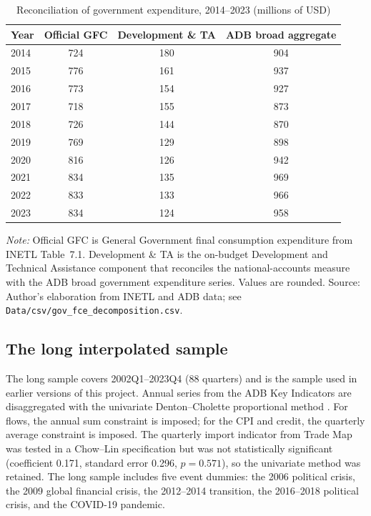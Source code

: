 \documentclass[11pt,a4paper]{article}
\begin{document}
\begin{table}[htbp]
\centering
\small
\caption{Reconciliation of government expenditure, 2014--2023 (millions of USD)}
\label{tab:gov_decomposition}
\begin{tabular}{@{}lccc@{}}
\toprule
Year & Official GFC & Development \& TA & ADB broad aggregate \\
\midrule
2014 & 724 & 180 & 904 \\
2015 & 776 & 161 & 937 \\
2016 & 773 & 154 & 927 \\
2017 & 718 & 155 & 873 \\
2018 & 726 & 144 & 870 \\
2019 & 769 & 129 & 898 \\
2020 & 816 & 126 & 942 \\
2021 & 834 & 135 & 969 \\
2022 & 833 & 133 & 966 \\
2023 & 834 & 124 & 958 \\
\bottomrule
\end{tabular}
\par\vspace{0.3em}
\begin{minipage}{0.95\textwidth}
\footnotesize\textit{Note:} Official GFC is General Government final consumption expenditure from INETL Table~7.1. Development \& TA is the on-budget Development and Technical Assistance component that reconciles the national-accounts measure with the ADB broad government expenditure series. Values are rounded. Source: Author's elaboration from INETL and ADB data; see \texttt{Data/csv/gov\_fce\_decomposition.csv}.
\end{minipage}
\end{table}

\subsection{The long interpolated sample}
\label{sec:long}

The long sample covers 2002Q1--2023Q4 (88 quarters) and is the sample used in earlier versions of this project. Annual series from the ADB Key Indicators \parencite{adb2025} are disaggregated with the univariate Denton--Cholette proportional method \parencite{denton1971,cholette1984,saxsteiner2013,tempdisagg}. For flows, the annual sum constraint is imposed; for the CPI and credit, the quarterly average constraint is imposed. The quarterly import indicator from Trade Map \parencite{trademap2025} was tested in a Chow--Lin specification but was not statistically significant (coefficient 0.171, standard error 0.296, $p=0.571$), so the univariate method was retained. The long sample includes five event dummies: the 2006 political crisis, the 2009 global financial crisis, the 2012--2014 transition, the 2016--2018 political crisis, and the COVID-19 pandemic.
\end{document}
